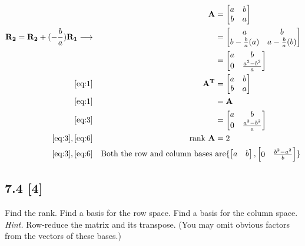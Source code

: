 \documentclass{article}
\begin{document}
\begin{align}
    \label{eq:1}
    && \textbf{A} &= \begin{bmatrix} 
    a & b\\
    b & a
    \end{bmatrix}
    \\
    \label{eq:2}
    \textbf{R\textsubscript{2}} = \textbf{R\textsubscript{2}} + (-\frac{b}{a})\textbf{R\textsubscript{1}} \longrightarrow && &= \begin{bmatrix}
    a & b\\
    b - \frac{b}{a}(a) & a - \frac{b}{a}(b)
    \end{bmatrix}
    \\
    \label{eq:3}
    && &= \begin{bmatrix}
    a & b\\
    0 & \frac{a^2 - b^2}{a}
    \end{bmatrix}
    \\
    \label{eq:4}
    \eqref{eq:1}
    && \textbf{A\textsuperscript{T}} &= \begin{bmatrix} 
    a & b\\
    b & a
    \end{bmatrix}
    \\
    \label{eq:5}
    \eqref{eq:1}
    && &= \textbf{A}
    \\
    \label{eq:6}
    \eqref{eq:3} && &= \begin{bmatrix}
    a & b\\
    0 & \frac{a^2 - b^2}{a}
    \end{bmatrix}
    \\
    \label{eq:7}
    \eqref{eq:3}, \eqref{eq:6} &&
    \text{rank \textbf{A}} &= 2
    \\
    \label{eq:8}
    \eqref{eq:3}, \eqref{eq:6} && \text{Both the row and column bases } &\text{are}
    \{ \begin{bmatrix} a & b \end{bmatrix}, \begin{bmatrix}
    0 & \frac{b^2 - a^2}{b}
    \end{bmatrix} \}
\end{align} 

\subsection*{7.4 [4]}
\setcounter{equation}{0}

Find the rank.  Find a basis for the row space.  Find a basis for the column space.  \textit{Hint.}  Row-reduce the matrix and its transpose.  (You may omit obvious factors from the vectors of these bases.)
\end{document}
